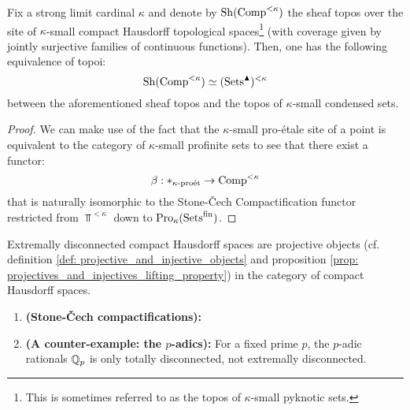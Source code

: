             \begin{lemma} \label{lemma: sheaves_over_compact_hausdorff_spaces}
                Fix a strong limit cardinal $\kappa$ and denote by $\mathrm{Sh}(\mathrm{Comp}^{< \kappa})$ the sheaf topos over the site of $\kappa$-small compact Hausdorff topological spaces\footnote{This is sometimes referred to as the topos of $\kappa$-small pyknotic sets.} (with coverage given by jointly surjective families of continuous functions). Then, one has the following equivalence of topoi:
                    $$\mathrm{Sh}(\mathrm{Comp}^{< \kappa}) \simeq (\mathrm{Sets}^{\blacktriangle})^{< \kappa}$$
                between the aforementioned sheaf topos and the topos of $\kappa$-small condensed sets.
            \end{lemma}
                \begin{proof}
                    We can make use of the fact that the $\kappa$-small pro-\'etale site of a point is equivalent to the category of $\kappa$-small profinite sets to see that there exist a functor:
                        $$\beta: *_{\kappa\text{-}\mathrm{pro\acute{e}t}} \to \mathrm{Comp}^{< \kappa}$$
                    that is naturally isomorphic to the Stone-\v{C}ech Compactification functor restricted from $\Top^{< \kappa}$ down to $\mathrm{Pro}_{\kappa}(\mathrm{Sets}^{\mathrm{fin}})$. 
                \end{proof}
            
            \begin{definition} \label{def: extrememly_disconnected_sets}
                Extremally disconnected compact Hausdorff spaces are projective objects (cf. definition \ref{def: projective_and_injective_objects} and proposition \ref{prop: projectives_and_injectives_lifting_property}) in the category of compact Hausdorff spaces.
            \end{definition}
            \begin{example}
                \noindent
                \begin{enumerate}
                    \item \textbf{(Stone-\v{C}ech compactifications):}
                    \item \textbf{(A counter-example: the $p$-adics):} For a fixed prime $p$, the $p$-adic rationals $\mathbb{Q}_p$ is only totally disconnected, not extremally disconnected. 
                \end{enumerate}
            \end{example}
            
